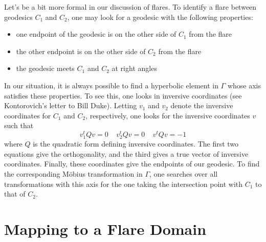 \documentclass[]{article}
\begin{document}
Let's be a bit more formal in our discussion of flares.
To identify a flare between geodesics $C_1$ and $C_2$, one may look for a geodesic with the following properties:
\begin{itemize}
	\item one endpoint of the geodesic is on the other side of $C_1$ from the flare
	\item the other endpoint is on the other side of $C_2$ from the flare
	\item the geodesic meets $C_1$ and $C_2$ at right angles
\end{itemize}
In our situation, it is always possible to find a hyperbolic element in $\Gamma$ whose axis satisfies these properties.
To see this, one looks in inversive coordinates (see Kontorovich's letter to Bill Duke).
Letting $v_1$ and $v_2$ denote the inversive coordinates for $C_1$ and $C_2$, respectively, one looks for the inversive coordinates $v$ such that
$$
v_1^tQv = 0 ~~~~~ v_2^tQv = 0 ~~~~~ v^tQv = -1
$$
where $Q$ is the quadratic form defining inversive coordinates.
The first two equations give the orthogonality, and the third gives a true vector of inversive coordinates.
Finally, these coordinates give the endpoints of our geodesic.
To find the corresponding M\"obius transformation in $\Gamma$, one searches over all transformations with this axis for the one taking the intersection point with $C_1$ to that of $C_2$.

\clearpage

\section*{Mapping to a Flare Domain}
\end{document}
